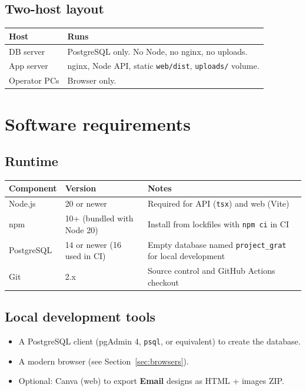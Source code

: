 \documentclass[11pt,a4paper]{article}
\begin{document}
\subsection{Two-host layout}
\begin{tabularx}{\textwidth}{lX}
  \toprule
  \textbf{Host} & \textbf{Runs} \\
  \midrule
  DB server & PostgreSQL only. No Node, no nginx, no uploads. \\
  App server & nginx, Node API, static \texttt{web/dist}, \texttt{uploads/} volume. \\
  Operator PCs & Browser only. \\
  \bottomrule
\end{tabularx}

\section{Software requirements}

\subsection{Runtime}
\begin{tabularx}{\textwidth}{llX}
  \toprule
  \textbf{Component} & \textbf{Version} & \textbf{Notes} \\
  \midrule
  Node.js & 20 or newer & Required for API (\texttt{tsx}) and web (Vite) \\
  npm & 10+ (bundled with Node 20) & Install from lockfiles with \texttt{npm ci} in CI \\
  PostgreSQL & 14 or newer (16 used in CI) & Empty database named \texttt{project\_grat} for local development \\
  Git & 2.x & Source control and GitHub Actions checkout \\
  \bottomrule
\end{tabularx}

\subsection{Local development tools}
\begin{itemize}[leftmargin=1.4em]
  \item A PostgreSQL client (pgAdmin 4, \texttt{psql}, or equivalent) to create the database.
  \item A modern browser (see Section~\ref{sec:browsers}).
  \item Optional: Canva (web) to export \textbf{Email} designs as HTML + images ZIP.
\end{itemize}
\end{document}
